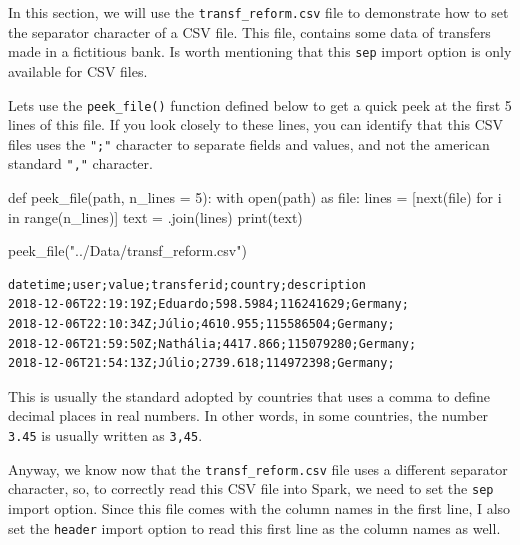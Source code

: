 \documentclass[
  11pt,
  letterpaper,
  DIV=11,
  numbers=noendperiod]{scrreprt}
\newenvironment{Shaded}{\begin{snugshade}}{\end{snugshade}}
\newcommand{\BuiltInTok}[1]{\textcolor[rgb]{0.00,0.23,0.31}{#1}}
\newcommand{\ControlFlowTok}[1]{\textcolor[rgb]{0.00,0.23,0.31}{#1}}
\newcommand{\DecValTok}[1]{\textcolor[rgb]{0.68,0.00,0.00}{#1}}
\newcommand{\ImportTok}[1]{\textcolor[rgb]{0.00,0.46,0.62}{#1}}
\newcommand{\KeywordTok}[1]{\textcolor[rgb]{0.00,0.23,0.31}{#1}}
\newcommand{\NormalTok}[1]{\textcolor[rgb]{0.00,0.23,0.31}{#1}}
\newcommand{\OperatorTok}[1]{\textcolor[rgb]{0.37,0.37,0.37}{#1}}
\newcommand{\StringTok}[1]{\textcolor[rgb]{0.13,0.47,0.30}{#1}}
\begin{document}
In this section, we will use the \texttt{transf\_reform.csv} file to
demonstrate how to set the separator character of a CSV file. This file,
contains some data of transfers made in a fictitious bank. Is worth
mentioning that this \texttt{sep} import option is only available for
CSV files.

Lets use the \texttt{peek\_file()} function defined below to get a quick
peek at the first 5 lines of this file. If you look closely to these
lines, you can identify that this CSV files uses the \texttt{";"}
character to separate fields and values, and not the american standard
\texttt{","} character.

\begin{Shaded}
\begin{Highlighting}[]
\KeywordTok{def}\NormalTok{ peek\_file(path, n\_lines }\OperatorTok{=} \DecValTok{5}\NormalTok{):}
  \ControlFlowTok{with} \BuiltInTok{open}\NormalTok{(path) }\ImportTok{as} \BuiltInTok{file}\NormalTok{:}
\NormalTok{    lines }\OperatorTok{=}\NormalTok{ [}\BuiltInTok{next}\NormalTok{(}\BuiltInTok{file}\NormalTok{) }\ControlFlowTok{for}\NormalTok{ i }\KeywordTok{in} \BuiltInTok{range}\NormalTok{(n\_lines)]}
\NormalTok{  text }\OperatorTok{=} \StringTok{\textquotesingle{}\textquotesingle{}}\NormalTok{.join(lines)}
  \BuiltInTok{print}\NormalTok{(text)}
  
\NormalTok{peek\_file(}\StringTok{"../Data/transf\_reform.csv"}\NormalTok{)}
\end{Highlighting}
\end{Shaded}

\begin{verbatim}
datetime;user;value;transferid;country;description
2018-12-06T22:19:19Z;Eduardo;598.5984;116241629;Germany;
2018-12-06T22:10:34Z;Júlio;4610.955;115586504;Germany;
2018-12-06T21:59:50Z;Nathália;4417.866;115079280;Germany;
2018-12-06T21:54:13Z;Júlio;2739.618;114972398;Germany;
\end{verbatim}

This is usually the standard adopted by countries that uses a comma to
define decimal places in real numbers. In other words, in some
countries, the number \texttt{3.45} is usually written as \texttt{3,45}.

Anyway, we know now that the \texttt{transf\_reform.csv} file uses a
different separator character, so, to correctly read this CSV file into
Spark, we need to set the \texttt{sep} import option. Since this file
comes with the column names in the first line, I also set the
\texttt{header} import option to read this first line as the column
names as well.
\end{document}
